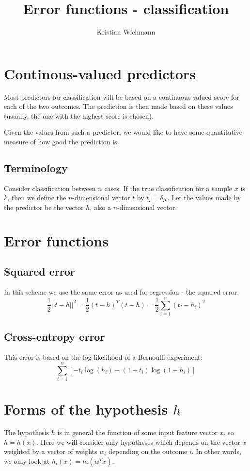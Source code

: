 \documentclass[12pt, a4paper]{article}
\title{Error functions - classification}
\author{Kristian Wichmann}
\numberwithin{equation}{section}
\begin{document}
\maketitle

\section{Continous-valued predictors}
Most predictors for classification will be based on a continuous-valued score for each of the two outcomes. The prediction is then made based on these values (usually, the one with the highest score is chosen).

Given the values from such a predictor, we would like to have some quantitative measure of how good the prediction is.

\subsection{Terminology}
Consider classification between $n$ cases. If the true classification for a sample $x$ is $k$, then we define the $n$-dimensional vector $t$ by $t_i=\delta_{ik}$. Let the values made by the predictor be the vector $h$, also a $n$-dimensional vector.

\section{Error functions}

\subsection{Squared error}
In this scheme we use the same error as used for regression - the squared error:
\begin{equation}
\frac{1}{2}||t-h||^2=\frac{1}{2}(t-h)^T(t-h)=\frac{1}{2}\sum_{i=1}^n(t_i-h_i)^2
\end{equation}

\subsection{Cross-entropy error}
This error is based on the log-likelihood of a Bernoulli experiment:
\begin{equation}
\sum_{i=1}^n\left[-t_i\log(h_i)-(1-t_i)\log(1-h_i)\right]
\end{equation}

\section{Forms of the hypothesis $h$}
The hypothesis $h$ is in general the function of some input feature vector $x$, so $h=h(x)$. Here we will consider only hypotheses which depends on the vector $x$ weighted by a vector of weights $w_i$ depending on the outcome $i$. In other words, we only look at $h_i(x)=h_i(w_i^T x)$.
\end{document}
